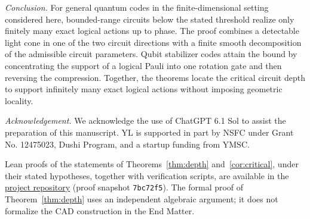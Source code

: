 \documentclass[aps,prl,reprint,notitlepage,nofootinbib,nobibnotes]{revtex4-2}
\begin{document}
\textit{Conclusion.}
For general quantum codes in the finite-dimensional setting considered
here, bounded-range circuits below the stated threshold realize only
finitely many exact logical actions up to phase. The proof combines a
detectable light cone in one of the two circuit directions with a
finite smooth decomposition of the admissible circuit parameters.
Qubit stabilizer codes attain the bound by concentrating the support
of a logical Pauli into one rotation gate and then reversing the
compression. Together, the theorems locate the critical circuit depth to support
infinitely many exact logical actions without imposing geometric
locality.

\begin{acknowledgments}
\textit{Acknowledgement.} We acknowledge the use of ChatGPT 6.1 Sol to assist the preparation of this manuscript. YL is supported in part
by NSFC under Grant No. 12475023, Dushi Program, and a startup funding from YMSC.
\end{acknowledgments}

Lean proofs of the statements of Theorems~\ref{thm:depth} and~\ref{cor:critical}, under their stated hypotheses, together with verification scripts, are available in the \href{https://github.com/Imine20/critical-depth-for-the-infinite-logical-set/tree/7bc72f5505f97e665ee8c34d177b6e6b0cde8afc}{project repository} (proof snapshot \texttt{7bc72f5}). The formal proof of Theorem~\ref{thm:depth} uses an independent algebraic argument; it does not formalize the CAD construction in the End Matter.
\end{document}
